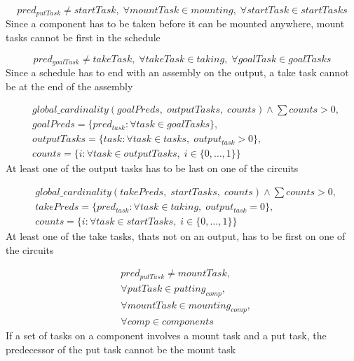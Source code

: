 \documentclass[10pt,a4paper]{report}
\begin{document}
\begin{equation}\label{eq:80}
pred_{putTask} \neq startTask, \; \forall mountTask \in mounting, \; \forall startTask \in startTasks\end{equation}
Since a component has to be taken before it can be mounted anywhere, mount tasks cannot be first in the schedule

\begin{equation}\label{eq:81}
pred_{goalTask} \neq takeTask, \; \forall takeTask \in taking, \; \forall goalTask \in goalTasks\end{equation}
Since a schedule has to end with an assembly on the output, a take task cannot be at the end of the assembly

\begin{equation}
\begin{aligned}\label{eq:82}
&global\_cardinality(goalPreds, \; outputTasks, \; counts) \land \sum counts > 0, \\
&goalPreds = \{pred_{task} : \forall task \in goalTasks\}, \\
&outputTasks = \{task : \forall task \in tasks, \; output_{task} > 0\}, \\
&counts = \{i : \forall task \in outputTasks, \; i \in \{0 , \ldots , 1\}\}
\end{aligned}
\end{equation}
At least one of the output tasks has to be last on one of the circuits


\begin{equation}
\begin{aligned}\label{eq:83}
&global\_cardinality(takePreds, \; startTasks, \; counts) \land \sum counts > 0, \\
&takePreds = \{pred_{task} : \forall task \in taking, \; output_{task} = 0\}, \\
&counts = \{i : \forall task \in startTasks, \; i \in \{0 , \ldots , 1\}\}
\end{aligned}
\end{equation}
At least one of the take tasks, thats not on an output, has to be first on one of the circuits


\begin{equation}
\begin{aligned}\label{eq:84}
&pred_{putTask} \neq mountTask, \\
&\forall putTask \in putting_{comp}, \\
&\forall mountTask \in mounting_{comp}, \\
&\forall comp \in components
\end{aligned}
\end{equation}
If a set of tasks on a component involves a mount task and a put task, the predecessor of the put task cannot be the mount task
\end{document}
